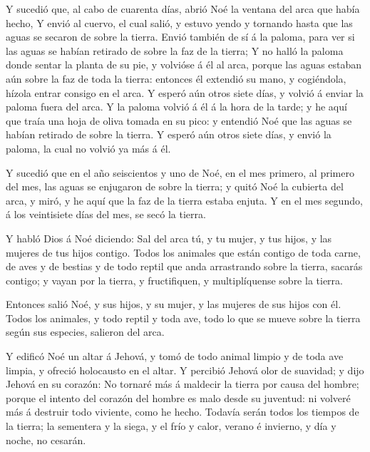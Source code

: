  Y sucedió que, al cabo de cuarenta días, abrió Noé la
ventana del arca que había hecho,  Y envió al cuervo, el
cual salió, y estuvo yendo y tornando hasta que las aguas se secaron de
sobre la tierra.  Envió también de sí á la paloma, para ver
si las aguas se habían retirado de sobre la faz de la tierra;
 Y no halló la paloma donde sentar la planta de su pie, y
volvióse á él al arca, porque las aguas estaban aún sobre la faz de toda
la tierra: entonces él extendió su mano, y cogiéndola, hízola entrar
consigo en el arca.  Y esperó aún otros siete días, y
volvió á enviar la paloma fuera del arca.  Y la paloma
volvió á él á la hora de la tarde; y he aquí que traía una hoja de oliva
tomada en su pico: y entendió Noé que las aguas se habían retirado de
sobre la tierra.  Y esperó aún otros siete días, y envió la
paloma, la cual no volvió ya más á él.

 Y sucedió que en el año seiscientos y uno de Noé, en el
mes primero, al primero del mes, las aguas se enjugaron de sobre la
tierra; y quitó Noé la cubierta del arca, y miró, y he aquí que la faz
de la tierra estaba enjuta.  Y en el mes segundo, á los
veintisiete días del mes, se secó la tierra.

 Y habló Dios á Noé diciendo:  Sal del arca
tú, y tu mujer, y tus hijos, y las mujeres de tus hijos contigo.
 Todos los animales que están contigo de toda carne, de
aves y de bestias y de todo reptil que anda arrastrando sobre la tierra,
sacarás contigo; y vayan por la tierra, y fructifiquen, y multiplíquense
sobre la tierra.

 Entonces salió Noé, y sus hijos, y su mujer, y las mujeres
de sus hijos con él.  Todos los animales, y todo reptil y
toda ave, todo lo que se mueve sobre la tierra según sus especies,
salieron del arca.

 Y edificó Noé un altar á Jehová, y tomó de todo animal
limpio y de toda ave limpia, y ofreció holocausto en el altar.
 Y percibió Jehová olor de suavidad; y dijo Jehová en su
corazón: No tornaré más á maldecir la tierra por causa del hombre;
porque el intento del corazón del hombre es malo desde su juventud: ni
volveré más á destruir todo viviente, como he hecho. 
Todavía serán todos los tiempos de la tierra; la sementera y la siega, y
el frío y calor, verano é invierno, y día y noche, no cesarán.

